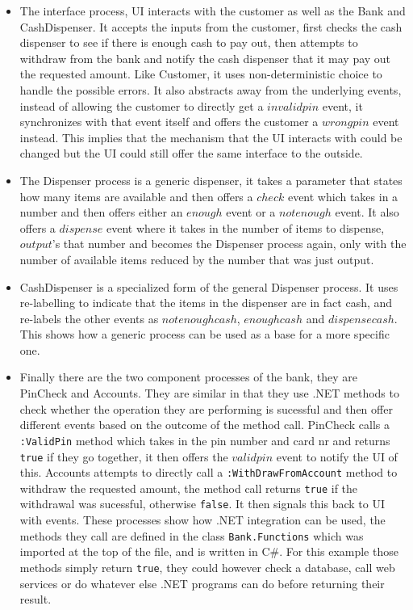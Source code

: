 \begin{itemize}
		\item The interface process, \textsf{UI} interacts with the customer as 
		well as the \textsf{Bank} and \textsf{CashDispenser}. It accepts the 
		inputs from the customer, first checks the cash dispenser to see if there 
		is enough cash to pay out, then attempts to withdraw from the bank and 
		notify the cash dispenser that it may pay out the requested amount. Like 
		\textsf{Customer}, it uses non-deterministic choice to handle the possible 
		errors. It also abstracts away from the underlying events, instead of 
		allowing the customer to directly get a $invalidpin$ event, it 
		synchronizes with that event itself and offers the customer a $wrongpin$ 
		event instead. This implies that the mechanism that the UI interacts with 
		could be changed but the UI could still offer the same interface to the
		outside.
		
		\item The \textsf{Dispenser} process is a generic dispenser, it takes a 
		parameter that states how many items are available and then offers a 
		$check$ event which takes in a number and then offers either an $enough$ 
		event or a $notenough$ event. It also offers a $dispense$ event where it 
		takes in the number of items to dispense, $output$'s that number and 
		becomes the \textsf{Dispenser} process again, only with the number of 
		available items reduced by the number that was just output.
		
		\item \textsf{CashDispenser} is a specialized form of the general 
		\textsf{Dispenser} process. It uses re-labelling to indicate that the 
		items in the dispenser are in fact cash, and re-labels the other events as 
		$notenoughcash$, $enoughcash$ and $dispensecash$. This shows how a generic 
		process can be used as a base for a more specific one.
		
		\item Finally there are the two component processes of the bank, they are 
		\textsf{PinCheck} and \textsf{Accounts}. They are similar in that they use 
		.NET methods to check whether the operation they are performing is 
		sucessful and then offer different events based on the outcome of the 
		method call. \textsf{PinCheck} calls a \texttt{:ValidPin} method which 
		takes in the pin number and card nr and returns \texttt{true} if they go 
		together, it then offers the $validpin$ event to notify the \textsf{UI} of 
		this. \textsf{Accounts} attempts to directly call a 
		\texttt{:WithDrawFromAccount} method to withdraw the requested amount, the 
		method call returns \texttt{true} if the withdrawal was sucessful, 
		otherwise \texttt{false}. It then signals this back to \textsf{UI} with 
		events. These processes show how .NET integration can be used, the methods 
		they call are defined in the class \texttt{Bank.Functions} which was 
		imported at the top of the file, and is written in C\#. For this example 
		those methods simply return \texttt{true}, they could however check a 
		database, call web services or do whatever else .NET programs can do 
		before returning their result.
		
  \end{itemize}


